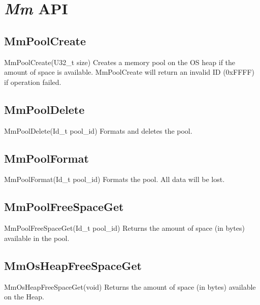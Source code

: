 \section{\textit{Mm} API}

\subsection{MmPoolCreate}
\label{func:MmPoolCreate}
\begin{pdfunction}
{MmPoolCreate(U32\_t size) }
{ 
Creates a memory pool on the OS heap if the amount of space 
is available. MmPoolCreate will return an invalid ID (0xFFFF) if 
operation failed. }
\end{pdfunction}

\subsection{MmPoolDelete}
\label{func:MmPoolDelete}
\begin{pdfunction}
{MmPoolDelete(Id\_t pool\_id) }
{ 
Formats and deletes the pool. }
\end{pdfunction}

\subsection{MmPoolFormat}
\label{func:MmPoolFormat}
\begin{pdfunction}
{MmPoolFormat(Id\_t pool\_id) }
{ 
Formats the pool. All data will be lost. }
\end{pdfunction}


\subsection{MmPoolFreeSpaceGet}
\label{func:MmPoolFreeSpaceGet}
\begin{pdfunction}
{MmPoolFreeSpaceGet(Id\_t pool\_id) }
{ 
Returns the amount of space (in bytes) available in the pool. }
\end{pdfunction}

\subsection{MmOsHeapFreeSpaceGet}
\label{func:MmOsHeapFreeSpaceGet}
\begin{pdfunction}
{MmOsHeapFreeSpaceGet(void) }
{ 
Returns the amount of space (in bytes) available on the 
Heap. }
\end{pdfunction}

